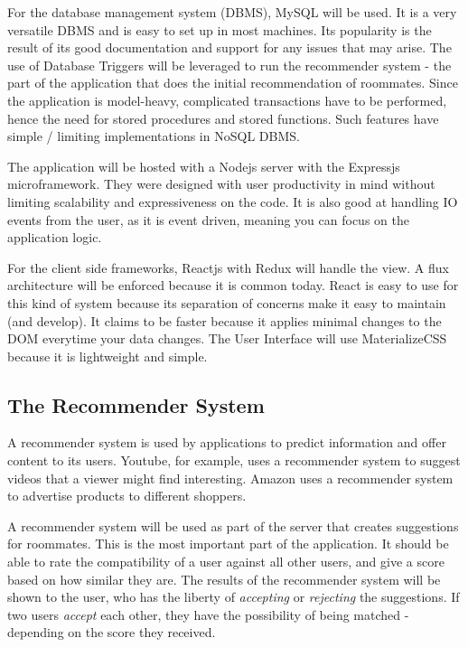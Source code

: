 \documentclass[journal]{./IEEE/IEEEtran}
\begin{document}
For the database management system (DBMS), MySQL will be used. It is a very versatile DBMS and is easy to set up in most machines. Its popularity is the result of its good documentation and support for any issues that may arise. The use of Database Triggers will be leveraged to run the recommender system - the part of the application that does the initial recommendation of roommates. Since the application is model-heavy, complicated transactions have to be performed, hence the need for stored procedures and stored functions. Such features have simple / limiting implementations in NoSQL DBMS.

The application will be hosted with a Nodejs server with the Expressjs microframework. They were designed with user productivity in mind without limiting scalability and expressiveness on the code. It is also good at handling IO events from the user, as it is event driven, meaning you can focus on the application logic.

For the client side frameworks, Reactjs with Redux will handle the view. A flux architecture will be enforced because it is common today. React is easy to use for this kind of system because its separation of concerns make it easy to maintain (and develop). It claims to be faster because it applies minimal changes to the DOM everytime your data changes. The User Interface will use MaterializeCSS because it is lightweight and simple.

\subsection{The Recommender System}
A recommender system is used by applications to predict information and offer content to its users\cite{katarya}. Youtube, for example, uses a recommender system to suggest videos that a viewer might find interesting. Amazon uses a recommender system to advertise products to different shoppers.

A recommender system will be used as part of the server that creates suggestions for roommates. This is the most important part of the application. It should be able to rate the compatibility of a user against all other users, and give a score based on how similar they are. The results of the recommender system will be shown to the user, who has the liberty of \textit{accepting} or \textit{rejecting} the suggestions. If two users \textit{accept} each other, they have the possibility of being matched - depending on the score they received.
\end{document}
